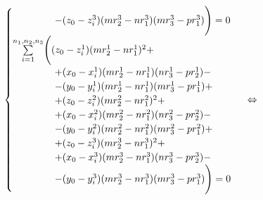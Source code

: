 $$\begin{cases}
		\hspace{1.5cm} - (z_0 - z_i^3) (m r_2^3 - n r_1^3) (m r_3^3 - p r_1^3) \Bigg) = 0 \\
	\underset{i=1}{\overset{n_1, n_2, n_3}{\sum}} \Bigg( 
		(z_0 - z_i^1) (m r_2^1 - n r_1^1)^2 + \\
		\hspace{1.5cm} + (x_0 - x_i^1) (m r_2^1 - n r_1^1) (n r_3^1 - p r_2^1) - \\
		\hspace{1.5cm} - (y_0 - y_i^1) (m r_2^1 - n r_1^1) (m r_3^1 - p r_1^1) + \\
		\hspace{1.5cm} + (z_0 - z_i^2) (m r_2^2 - n r_1^2)^2 + \\
		\hspace{1.5cm} + (x_0 - x_i^2) (m r_2^2 - n r_1^2) (n r_3^2 - p r_2^2) - \\
		\hspace{1.5cm} - (y_0 - y_i^2) (m r_2^2 - n r_1^2) (m r_3^2 - p r_1^2) + \\
		\hspace{1.5cm} + (z_0 - z_i^3) (m r_2^3 - n r_1^3)^2 + \\
		\hspace{1.5cm} + (x_0 - x_i^3) (m r_2^3 - n r_1^3) (n r_3^3 - p r_2^3) - \\
		\hspace{1.5cm} - (y_0 - y_i^3) (m r_2^3 - n r_1^3) (m r_3^3 - p r_1^3) \Bigg) = 0
\end{cases} \; \Leftrightarrow$$

